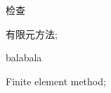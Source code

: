 \begin{cnabstract}


检查


\end{cnabstract}

\begin{cnkeywords}
有限元方法; 
\end{cnkeywords}


\newpage
\begin{enabstract}

balabala

\end{enabstract}

\begin{enkeywords}
  Finite element method;
\end{enkeywords} 
